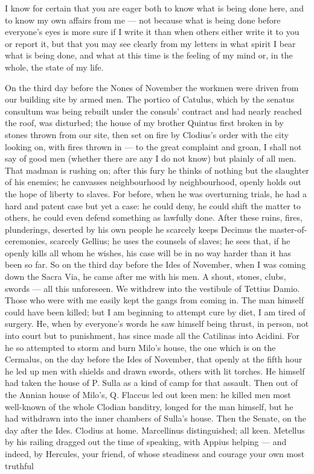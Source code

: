 

 I know for certain that you are eager both to know what is being done here, and to know my own affairs from me --- not because what is being done before everyone's eyes is more sure if I write it than when others either write it to you or report it, but that you may see clearly from my letters in what spirit I bear what is being done, and what at this time is the feeling of my mind or, in the whole, the state of my life.

 On the third day before the Nones of November the workmen were driven from our building site by armed men. The portico of Catulus, which by the senatus consultum was being rebuilt under the consuls' contract and had nearly reached the roof, was disturbed; the house of my brother Quintus first broken in by stones thrown from our site, then set on fire by Clodius's order with the city looking on, with fires thrown in --- to the great complaint and groan, I shall not say of good men (whether there are any I do not know) but plainly of all men. That madman is rushing on; after this fury he thinks of nothing but the slaughter of his enemies; he canvasses neighbourhood by neighbourhood, openly holds out the hope of liberty to slaves. For before, when he was overturning trials, he had a hard and patent case but yet a case: he could deny, he could shift the matter to others, he could even defend something as lawfully done. After these ruins, fires, plunderings, deserted by his own people he scarcely keeps Decimus the master-of-ceremonies, scarcely Gellius; he uses the counsels of slaves; he sees that, if he openly kills all whom he wishes, his case will be in no way harder than it has been so far. So on the third day before the Ides of November, when I was coming down the Sacra Via, he came after me with his men. A shout, stones, clubs, swords --- all this unforeseen. We withdrew into the vestibule of Tettius Damio. Those who were with me easily kept the gangs from coming in. The man himself could have been killed; but I am beginning to attempt cure by diet, I am tired of surgery. He, when by everyone's words he saw himself being thrust, in person, not into court but to punishment, has since made all the Catilinas into Acidini. For he so attempted to storm and burn Milo's house, the one which is on the Cermalus, on the day before the Ides of November, that openly at the fifth hour he led up men with shields and drawn swords, others with lit torches. He himself had taken the house of P. Sulla as a kind of camp for that assault. Then out of the Annian house of Milo's, Q. Flaccus led out keen men: he killed men most well-known of the whole Clodian banditry, longed for the man himself, but he had withdrawn into the inner chambers of Sulla's house. Then the Senate, on the day after the Ides. Clodius at home. Marcellinus distinguished; all keen. Metellus by his railing dragged out the time of speaking, with Appius helping --- and indeed, by Hercules, your friend, of whose steadiness and courage your own most truthful 